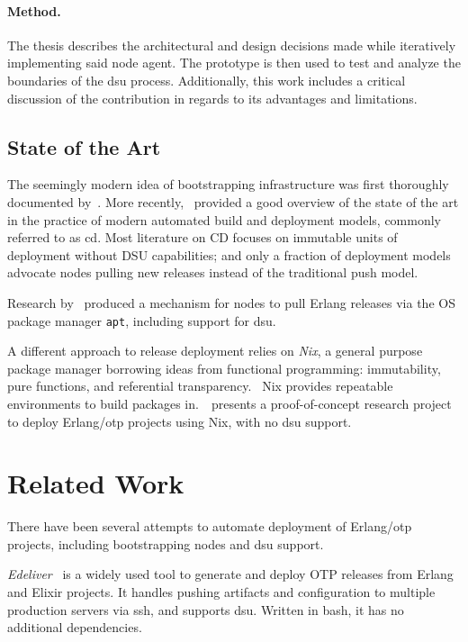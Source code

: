 \paragraph{Method.} The thesis describes the architectural and design decisions made while iteratively implementing said node agent. The prototype is then used to test and analyze the boundaries of the \acrshort{dsu} process. Additionally, this work includes a critical discussion of the contribution in regards to its advantages and limitations.

\cleardoublepage
\subsection{State of the Art}\label{sec:sota}

The seemingly modern idea of bootstrapping infrastructure was first thoroughly documented by~\cite{traugott1998bootstrapping}. More recently,~\cite{adams2016modern} provided a good overview of the state of the art in the practice of modern automated build and deployment models, commonly referred to as \acrfull{cd}. Most literature on CD focuses on immutable units of deployment without DSU capabilities; and only a fraction of deployment models advocate nodes pulling new releases instead of the traditional push model.

Research by~\cite{wielgus2013erlang} produced a mechanism for nodes to pull Erlang releases via the OS package manager \lstinline|apt|, including support for \acrshort{dsu}.

A different approach to release deployment relies on \emph{Nix}, a general purpose package manager borrowing ideas from functional programming: immutability, pure functions, and referential transparency.~\cite{nix1} Nix provides repeatable environments to build packages in.~\cite{erlangnix2}~presents a proof-of-concept research project to deploy Erlang/\acrshort{otp} projects using Nix, with no \acrshort{dsu} support.

\cleardoublepage
\section{Related Work}\label{sec:related_work}

There have been several attempts to automate deployment of Erlang/\acrshort{otp} projects, including bootstrapping nodes and \acrshort{dsu} support.

\emph{Edeliver}~\cite{edeliver,talk:edeliver} is a widely used tool to generate and deploy OTP releases from Erlang and Elixir projects. It handles pushing artifacts and configuration to multiple production servers via \acrshort{ssh}, and supports \acrshort{dsu}. Written in bash, it has no additional dependencies.

